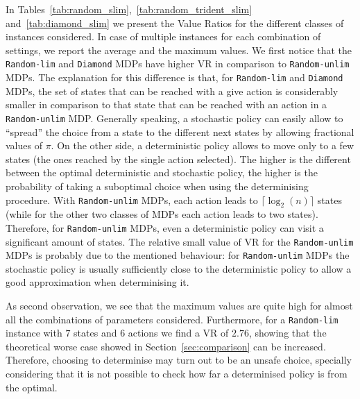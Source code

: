 In Tables~\ref{tab:random_slim},~\ref{tab:random_trident_slim} and~\ref{tab:diamond_slim} we present the Value Ratios for the different classes of instances considered. In case of multiple instances for each combination of settings, we report the average and the maximum values.
%
We first notice that the \texttt{Random-lim} and \texttt{Diamond} MDPs have higher VR in comparison to \texttt{Random-unlim} MDPs. The explanation for this difference is that, for \texttt{Random-lim} and \texttt{Diamond} MDPs, the set of states that can be reached with a give action is considerably smaller in comparison to that state that can be reached with an action in a \texttt{Random-unlim} MDP. 
%
Generally speaking, a stochastic policy can easily allow to ``spread'' the choice from a state to the different next states by allowing fractional values of $\pi$.
On the other side, a deterministic policy allows to move only to a few states (the ones reached by the single action selected). The higher is the different between the optimal deterministic and stochastic policy, the higher is the probability of taking a suboptimal choice when using the determinising procedure.
%
With \texttt{Random-unlim} MDPs, each action leads to  $\lceil \log_2(n) \rceil$ states (while for the other two classes of MDPs each action leads to two states). Therefore, for \texttt{Random-unlim} MDPs, even a deterministic policy can visit a significant amount of states.
%
The relative small value of VR for the \texttt{Random-unlim} MDPs is probably due to the mentioned behaviour: for \texttt{Random-unlim} MDPs the stochastic policy is usually sufficiently close to the deterministic policy to allow a good approximation when determinising it. 

%

As second observation, we see that the maximum values are quite high for almost all the combinations of parameters considered. Furthermore, for a \texttt{Random-lim} instance with $7$ states and $6$ actions we find a VR of $2.76$, showing that the theoretical worse case showed in Section~\ref{sec:comparison} can be increased. 
%
Therefore, choosing to determinise may turn out to be an unsafe choice, specially considering that it is not possible to check how far a determinised policy is from the optimal.  


